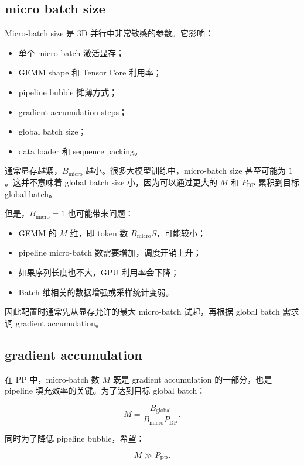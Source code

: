 \subsection{micro batch size}
\label{subsec:micro-batch-size}

Micro-batch size 是 3D 并行中非常敏感的参数。它影响：

\begin{itemize}
\item 单个 micro-batch 激活显存；
\item GEMM shape 和 Tensor Core 利用率；
\item pipeline bubble 摊薄方式；
\item gradient accumulation steps；
\item global batch size；
\item data loader 和 sequence packing。
\end{itemize}

通常显存越紧，$B_{\mathrm{micro}}$ 越小。很多大模型训练中，micro-batch size 甚至可能为 $1$。这并不意味着 global batch size 小，因为可以通过更大的 $M$ 和 $P_{\mathrm{DP}}$ 累积到目标 global batch。

但是，$B_{\mathrm{micro}}=1$ 也可能带来问题：

\begin{itemize}
\item GEMM 的 $M$ 维，即 token 数 $B_{\mathrm{micro}}S$，可能较小；
\item pipeline micro-batch 数需要增加，调度开销上升；
\item 如果序列长度也不大，GPU 利用率会下降；
\item Batch 维相关的数据增强或采样统计变弱。
\end{itemize}

因此配置时通常先从显存允许的最大 micro-batch 试起，再根据 global batch 需求调 gradient accumulation。

\subsection{gradient accumulation}
\label{subsec:gradient-accumulation-in-3d}

在 PP 中，micro-batch 数 $M$ 既是 gradient accumulation 的一部分，也是 pipeline 填充效率的关键。为了达到目标 global batch：

\[
M
=
\frac{B_{\mathrm{global}}}
{B_{\mathrm{micro}}P_{\mathrm{DP}}}.
\]

同时为了降低 pipeline bubble，希望：

\[
M \gg P_{\mathrm{PP}}.
\]

